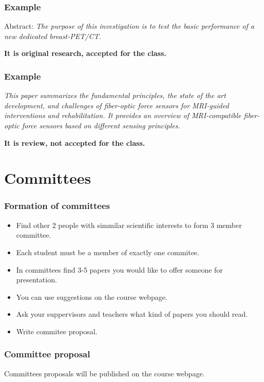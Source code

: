 \begin{frame}
\frametitle{Example}

\pause
Abstract: \textit{The purpose of this investigation is to test the basic performance of a new dedicated breast‐PET/CT.}

\pause
\textbf{It is original research, accepted for the class.}
\end{frame}

\begin{frame}
\frametitle{Example}

\pause
\textit{This paper summarizes the fundamental principles, the state of the art development, and challenges of fiber-optic force sensors for MRI-guided interventions and rehabilitation. It provides an overview of MRI-compatible fiber-optic force sensors based on different sensing principles.}

\pause
\textbf{It is review, not accepted for the class.}
\end{frame}


\section{Committees}
\begin{frame}
\frametitle{Formation of committees}
\begin{itemize}
\item Find other 2 people with simmilar scientific interests to form 3 member committee.
\item Each student must be a member of exactly one commitee.
\item In committees find 3-5 papers you would like to offer someone for presentation.
\item You can use suggestions on the course webpage.
\item Ask your suppervisors and teachers what kind of papers you should read.
\item Write commitee proposal.
\end{itemize}
\end{frame}



\begin{frame}
\frametitle{Committee proposal}

Committees proposals will be published on the course webpage.

\end{frame}

